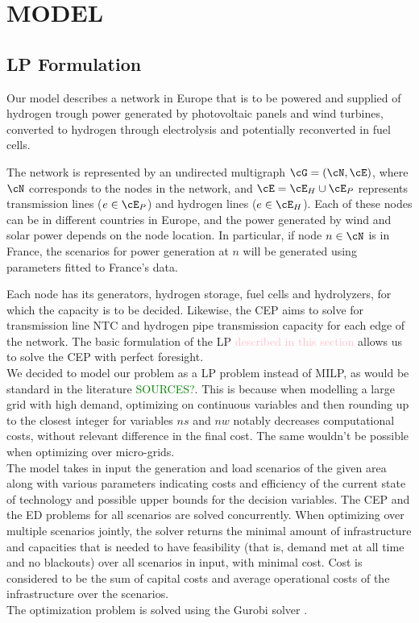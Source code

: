 \section{MODEL}

\subsection{LP Formulation}\label{section: LP}
Our model describes a network in Europe that is to be powered and supplied of hydrogen trough power generated by photovoltaic panels and wind turbines, converted to hydrogen through electrolysis and potentially reconverted in fuel cells.


The network is represented by an undirected multigraph \(\cG = (\cN, \cE)\), where \(\cN\) corresponds to the nodes in the network, and \(\cE = \cE_H \cup \cE_P\) represents transmission lines (\(e \in \cE_P\)) and hydrogen lines (\(e \in \cE_H\)). Each of these nodes can be in different countries in Europe, and the power generated by wind and solar power depends on the node location. In particular, if node \(n \in \cN\) is in France, the scenarios for power generation at \(n\) will be generated using parameters fitted to France's data.

Each node has its generators, hydrogen storage, fuel cells and hydrolyzers, for which the capacity is to be decided. Likewise, the CEP aims to solve for transmission line NTC and hydrogen pipe transmission capacity for each edge of the network. The basic formulation of the LP \textcolor{pink}{described in this section} allows us to solve the CEP with perfect foresight. \\
\indent We decided to model our problem as a LP problem instead of MILP, as would be standard in the literature \textcolor{Green}{SOURCES?}. This is because when modelling a large grid with high demand, optimizing on continuous variables and then rounding up to the closest integer for variables $ns$ and $nw$ notably decreases computational costs, without relevant difference in the final cost. The same wouldn't be possible when optimizing over micro-grids.\\
\indent The model takes in input the generation and load scenarios of the given area along with various parameters indicating costs and efficiency of the current state of technology and possible upper bounds for the decision variables. The CEP and the ED problems for all scenarios are solved concurrently. When optimizing over multiple scenarios jointly, the solver returns the minimal amount of infrastructure and capacities that is needed to have feasibility (that is, demand met at all time and no blackouts) over all scenarios in input, with minimal cost. Cost is considered to be the sum of capital costs and average operational costs of the infrastructure over the scenarios.\\
\indent The optimization problem is solved using the Gurobi solver \textcolor{green}{\cite{Gurobi}}.



